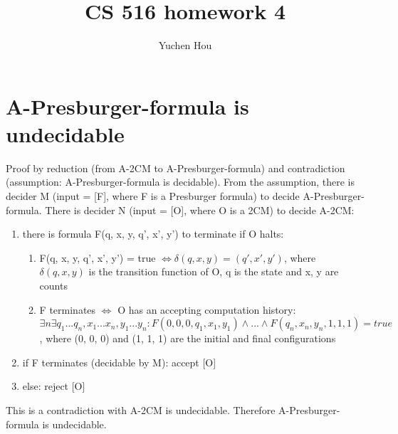 \documentclass{article}
\begin{document}
\lstset{language=python, tabsize=4}
\title{CS 516 homework 4}
\author{Yuchen Hou}
\maketitle

\section{A-Presburger-formula is undecidable}
Proof by reduction (from A-2CM to A-Presburger-formula) and contradiction 
(assumption: A-Presburger-formula is decidable).
From the assumption, there is decider M (input = [F], where F is a Presburger 
formula) to decide A-Presburger-formula.
There is decider N (input = [O], where O is a 2CM) to decide A-2CM:
\begin{enumerate}
	\item there is formula F(q, x, y, q', x', y') to terminate if O halts:
	\begin{enumerate}
		\item F(q, x, y, q', x', y') = true $ \iff \delta(q, x, y) = (q', x', 
		y') $, where $ \delta(q, x, y) $ is the transition function of O, q is 
		the state and x, y are counts
		\item F terminates $ \iff $ O has an accepting computation history: $ 
		\exists n \exists q_1 ... q_n, x_1 ... x_n, y_1 ... y_n : F(0, 0, 0, 
		q_1, x_1, y_1) \land ... \land F(q_n, x_n, y_n, 1, 1, 1) = true$, where 
		(0, 0, 0) and (1, 1, 1) are the initial and final configurations
	\end{enumerate}
	\item if F terminates (decidable by M): accept [O]
	\item else: reject [O]
\end{enumerate}
This is a contradiction with A-2CM is undecidable. Therefore 
A-Presburger-formula is undecidable.
\end{document}
